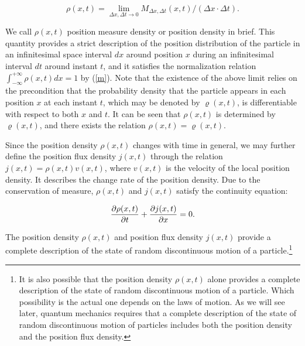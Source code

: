 \begin{equation}
\rho(x,t)=\lim_{\Delta x, \Delta t \rightarrow 0} {M_{\Delta x,\Delta t}(x,t)/(\Delta x \cdot \Delta t)}.
\label{rho}
\end{equation}

\noindent We call $\rho(x,t)$ position measure density or position density in brief. 
This quantity provides a strict description of the position distribution of the particle in an infinitesimal space interval $dx$ around position $x$ during an infinitesimal interval $dt$ around instant $t$, and it satisfies the normalization relation $\int_{-\infty}^{+\infty}{\rho(x,t)dx}=1$ by (\ref{m}). 
Note that the existence of the above limit relies on the precondition that the probability density that the particle appears in each position $x$ at each instant $t$, which may be denoted by $\varrho(x,t)$, is differentiable with respect to both $x$ and $t$. It can be seen that $\rho(x,t)$ is determined by $\varrho(x,t)$, and there exists the relation $\rho(x,t)=\varrho(x,t)$.

Since the position density $\rho(x,t)$ changes with time in general, we may further define the position flux density $j(x,t)$ through the relation $j(x,t)=\rho(x,t)v(x,t)$, where $v(x,t)$ is the velocity of the local position density. It describes the change rate of the position density. Due to the conservation of measure, $\rho(x,t)$ and $j(x,t)$ satisfy the continuity equation: 

\begin{equation}
{{\partial \rho(x,t)}\over{\partial t}}+{{\partial j(x,t)}\over{\partial x}}=0.
\label{}
\end{equation}

\noindent The position density $\rho(x,t)$ and position flux density $j(x,t)$ provide a complete description of the state of random discontinuous motion of a particle.\footnote{It is also possible that the position density $\rho(x,t)$ alone provides a complete description of the state of random discontinuous motion of a particle. Which possibility is the actual one depends on the laws of motion. As we will see later, quantum mechanics requires that a complete description of the state of random discontinuous motion of particles includes both the position density and the position flux density.}


